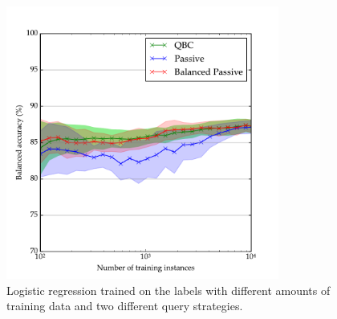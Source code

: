     \begin{figure}
        \centering
        \includegraphics[width=0.8\textwidth]
            {images/experiments/rgz_qbc.pdf}
        \caption{Logistic regression trained on the \citeauthor{norris06}
            labels with different amounts of training data and two different
            query strategies.}
        \label{fig:rgz-qbc}
    \end{figure}
